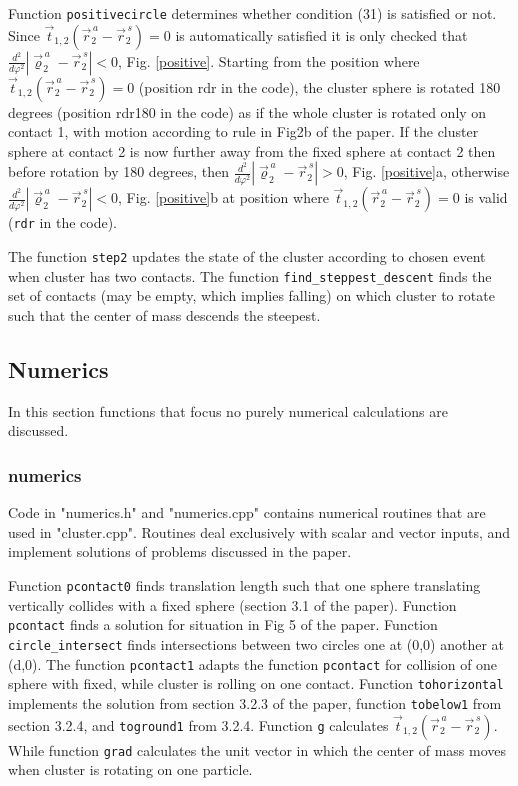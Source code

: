 \documentclass[12pt]{article}
\begin{document}
Function \texttt{positivecircle} determines whether condition (31) is satisfied or not. Since $\vec{t}_{1,2}\left(\vec{r}^{\,a}_2-\vec{r}^{\,s}_2\right)=0$ is automatically satisfied it is only checked that $\frac{d^2}{d\varphi^2}\left|\vec{\varrho}^{\,a}_2-\vec{r}^{\,s}_2\right| < 0$, Fig. \ref{positive}. Starting from the position where $\vec{t}_{1,2}\left(\vec{r}^{\,a}_2-\vec{r}^{\,s}_2\right)=0$ (position rdr in the code), the cluster sphere is rotated 180 degrees (position rdr180 in the code) as if the whole cluster is rotated only on contact 1, with motion according to rule in Fig2b of the paper. If the cluster sphere at contact 2 is now further away from the fixed sphere at contact 2 then before rotation by 180 degrees, then $\frac{d^2}{d\varphi^2}\left|\vec{\varrho}^{\,a}_2-\vec{r}^{\,s}_2\right| > 0$, Fig. \ref{positive}a, otherwise $\frac{d^2}{d\varphi^2}\left|\vec{\varrho}^{\,a}_2-\vec{r}^{\,s}_2\right| < 0$, Fig. \ref{positive}b at position where $\vec{t}_{1,2}\left(\vec{r}^{\,a}_2-\vec{r}^{\,s}_2\right)=0$ is valid (\texttt{rdr} in the code). 

The function \texttt{step2} updates the state of the cluster according to chosen event when cluster has two contacts. The function \texttt{find\_steppest\_descent} finds the set of contacts (may be empty, which implies falling) on which cluster to rotate such that the center of mass descends the steepest. 

\subsection{Numerics}
In this section functions that focus no purely numerical calculations are discussed. 
\subsubsection{numerics}
Code in "numerics.h" and "numerics.cpp" contains numerical routines that are used in "cluster.cpp". Routines deal exclusively with scalar and vector inputs, and implement solutions of problems discussed in the paper.

Function \texttt{pcontact0} finds translation length such that one sphere translating vertically collides with a fixed sphere (section 3.1 of the paper). Function \texttt{pcontact} finds a solution for situation in Fig 5 of the paper. Function \texttt{circle\_intersect} finds intersections between two circles one at (0,0) another at (d,0). The function \texttt{pcontact1} adapts the function \texttt{pcontact} for collision of one sphere with fixed, while cluster is rolling on one contact. Function \texttt{tohorizontal} implements the solution from section 3.2.3 of the paper, function \texttt{tobelow1} from section 3.2.4, and \texttt{toground1} from 3.2.4. Function \texttt{g} calculates $\vec{t}_{1,2}\left(\vec{r}^{\,a}_2-\vec{r}^{\,s}_2\right)$. While function \texttt{grad} calculates the unit vector in which the center of mass moves when cluster is rotating on one particle. 
\end{document}
